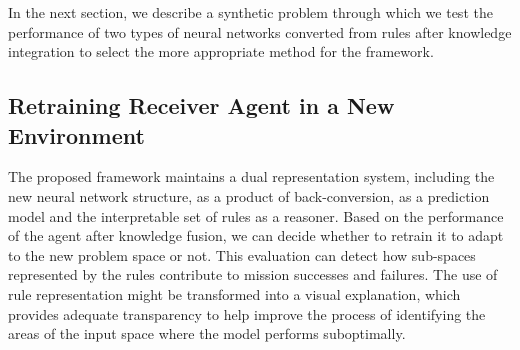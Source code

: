 \documentclass[lettersize,journal]{IEEEtran}
\begin{document}
In the next section, we describe a synthetic problem through which we test the performance of two types of neural networks converted from rules after knowledge integration to select the more appropriate method for the framework.


\subsection{Retraining Receiver Agent in a New Environment}\label{jpaper2-methodology-fusion-retraining}

The proposed framework maintains a dual representation system, including the new neural network structure, as a product of back-conversion, as a prediction model and the interpretable set of rules as a reasoner. Based on the performance of the agent after knowledge fusion, we can decide whether to retrain it to adapt to the new problem space or not. This evaluation can detect how sub-spaces represented by the rules contribute to mission successes and failures. The use of rule representation might be transformed into a visual explanation, which provides adequate transparency to help improve the process of identifying the areas of the input space where the model performs suboptimally.
\end{document}
